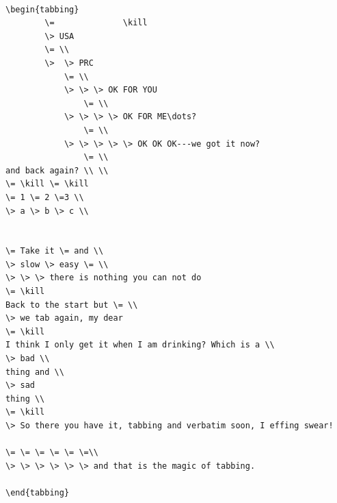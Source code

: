 \documentclass[10pt|draft]{report}
\begin{document}
\begin{verbatim}

\begin{tabbing}
        \=              \kill
        \> USA
        \= \\
        \>  \> PRC
            \= \\
            \> \> \> OK FOR YOU
                \= \\
            \> \> \> \> OK FOR ME\dots?
                \= \\
            \> \> \> \> \> OK OK OK---we got it now?
                \= \\
and back again? \\ \\
\= \kill \= \kill
\= 1 \= 2 \=3 \\
\> a \> b \> c \\


\= Take it \= and \\
\> slow \> easy \= \\
\> \> \> there is nothing you can not do
\= \kill
Back to the start but \= \\
\> we tab again, my dear
\= \kill
I think I only get it when I am drinking? Which is a \\
\> bad \\
thing and \\
\> sad
thing \\
\= \kill
\> So there you have it, tabbing and verbatim soon, I effing swear!

\= \= \= \= \= \=\\
\> \> \> \> \> \> and that is the magic of tabbing.

\end{tabbing}
\end{verbatim}
\end{document}
